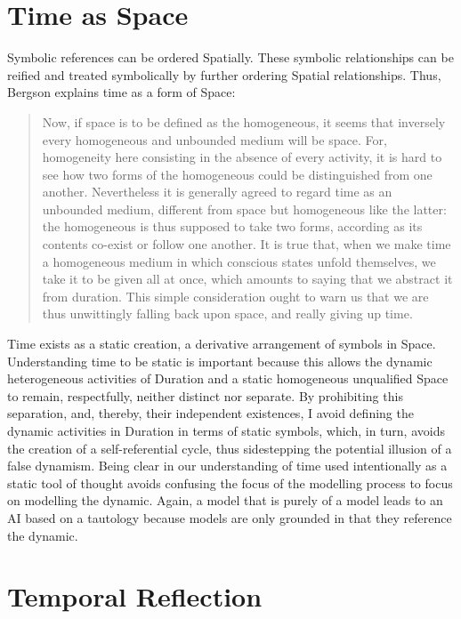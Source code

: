 \section{Time as Space}

Symbolic references can be ordered Spatially.  These symbolic
relationships can be reified and treated symbolically by further
ordering Spatial relationships.  Thus, Bergson explains time as a form
of Space:

\begin{quote}
Now, if space is to be defined as the homogeneous, it seems that
inversely every homogeneous and unbounded medium will be space.  For,
homogeneity here consisting in the absence of every activity, it is
hard to see how two forms of the homogeneous could be distinguished
from one another.  Nevertheless it is generally agreed to regard time
as an unbounded medium, different from space but homogeneous like the
latter: the homogeneous is thus supposed to take two forms, according
as its contents co-exist or follow one another.  It is true that, when
we make time a homogeneous medium in which conscious states unfold
themselves, we take it to be given all at once, which amounts to
saying that we abstract it from duration.  This simple consideration
ought to warn us that we are thus unwittingly falling back upon space,
and really giving up time.
\end{quote}

Time exists as a static creation, a derivative arrangement of symbols
in Space.  Understanding time to be static is important because this
allows the dynamic heterogeneous activities of Duration and a static
homogeneous unqualified Space to remain, respectfully, neither
distinct nor separate.  By prohibiting this separation, and, thereby,
their independent existences, I avoid defining the dynamic activities
in Duration in terms of static symbols, which, in turn, avoids the
creation of a self-referential cycle, thus sidestepping the potential
illusion of a false dynamism.  Being clear in our understanding of
time used intentionally as a static tool of thought avoids confusing
the focus of the modelling process to focus on modelling the dynamic.
Again, a model that is purely of a model leads to an AI based on a
tautology because models are only grounded in that they reference the
dynamic.

\section{Temporal Reflection}

